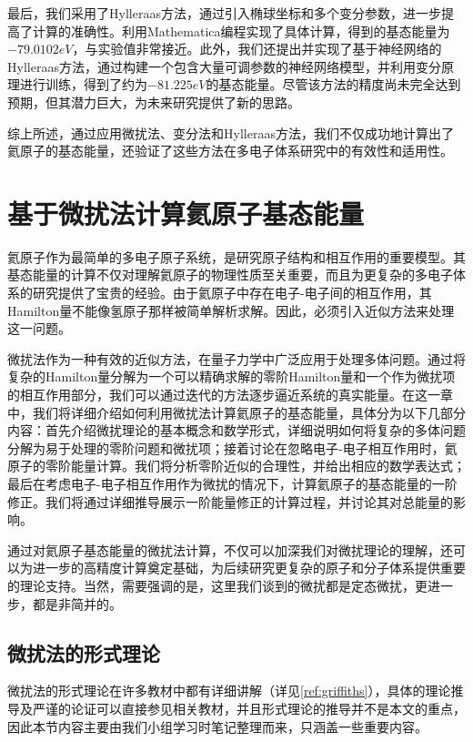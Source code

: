 最后，我们采用了Hylleraas方法，通过引入椭球坐标和多个变分参数，进一步提高了计算的准确性。利用Mathematica编程实现了具体计算，得到的基态能量为$-79.0102 eV$，与实验值非常接近。此外，我们还提出并实现了基于神经网络的Hylleraas方法，通过构建一个包含大量可调参数的神经网络模型，并利用变分原理进行训练，得到了约为$-81.225 eV$的基态能量。尽管该方法的精度尚未完全达到预期，但其潜力巨大，为未来研究提供了新的思路。

综上所述，通过应用微扰法、变分法和Hylleraas方法，我们不仅成功地计算出了氦原子的基态能量，还验证了这些方法在多电子体系研究中的有效性和适用性。


\section{基于微扰法计算氦原子基态能量}
氦原子作为最简单的多电子原子系统，是研究原子结构和相互作用的重要模型。其基态能量的计算不仅对理解氦原子的物理性质至关重要，而且为更复杂的多电子体系的研究提供了宝贵的经验。由于氦原子中存在电子-电子间的相互作用，其Hamilton量不能像氢原子那样被简单解析求解。因此，必须引入近似方法来处理这一问题。

微扰法作为一种有效的近似方法，在量子力学中广泛应用于处理多体问题。通过将复杂的Hamilton量分解为一个可以精确求解的零阶Hamilton量和一个作为微扰项的相互作用部分，我们可以通过迭代的方法逐步逼近系统的真实能量。在这一章中，我们将详细介绍如何利用微扰法计算氦原子的基态能量，具体分为以下几部分内容：首先介绍微扰理论的基本概念和数学形式，详细说明如何将复杂的多体问题分解为易于处理的零阶问题和微扰项；接着讨论在忽略电子-电子相互作用时，氦原子的零阶能量计算。我们将分析零阶近似的合理性，并给出相应的数学表达式；最后在考虑电子-电子相互作用作为微扰的情况下，计算氦原子的基态能量的一阶修正。我们将通过详细推导展示一阶能量修正的计算过程，并讨论其对总能量的影响。

通过对氦原子基态能量的微扰法计算，不仅可以加深我们对微扰理论的理解，还可以为进一步的高精度计算奠定基础，为后续研究更复杂的原子和分子体系提供重要的理论支持。当然，需要强调的是，这里我们谈到的微扰都是定态微扰，更进一步，都是非简并的。

\subsection{微扰法的形式理论}
微扰法的形式理论在许多教材中都有详细讲解（详见\cref{ref:griffiths}），具体的理论推导及严谨的论证可以直接参见相关教材，并且形式理论的推导并不是本文的重点，因此本节内容主要由我们小组学习时笔记整理而来，只涵盖一些重要内容。

